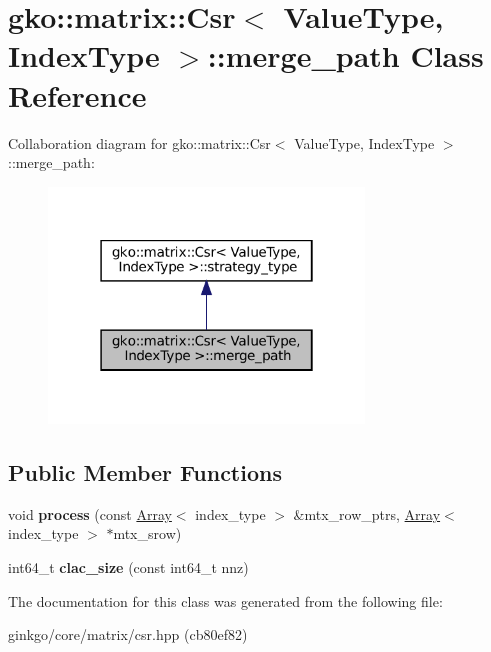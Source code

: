 \hypertarget{classgko_1_1matrix_1_1Csr_1_1merge__path}{}\section{gko\+:\+:matrix\+:\+:Csr$<$ Value\+Type, Index\+Type $>$\+:\+:merge\+\_\+path Class Reference}
\label{classgko_1_1matrix_1_1Csr_1_1merge__path}


Collaboration diagram for gko\+:\+:matrix\+:\+:Csr$<$ Value\+Type, Index\+Type $>$\+:\+:merge\+\_\+path\+:
\nopagebreak
\begin{figure}[H]
\begin{center}
\leavevmode
\includegraphics[width=238pt]{classgko_1_1matrix_1_1Csr_1_1merge__path__coll__graph}
\end{center}
\end{figure}
\subsection*{Public Member Functions}
\begin{DoxyCompactItemize}
\item 
\mbox{\label{classgko_1_1matrix_1_1Csr_1_1merge__path_a617d0a285a7851c025a56bf1ae096bc7}} 
void {\bfseries process} (const \hyperlink{classgko_1_1Array}{Array}$<$ index\+\_\+type $>$ \&mtx\+\_\+row\+\_\+ptrs, \hyperlink{classgko_1_1Array}{Array}$<$ index\+\_\+type $>$ $\ast$mtx\+\_\+srow)
\item 
\mbox{\label{classgko_1_1matrix_1_1Csr_1_1merge__path_aea68ffff5b689f63bbece61d5dc80112}} 
int64\+\_\+t {\bfseries clac\+\_\+size} (const int64\+\_\+t nnz)
\end{DoxyCompactItemize}


The documentation for this class was generated from the following file\+:\begin{DoxyCompactItemize}
\item 
ginkgo/core/matrix/csr.\+hpp (cb80ef82)\end{DoxyCompactItemize}
